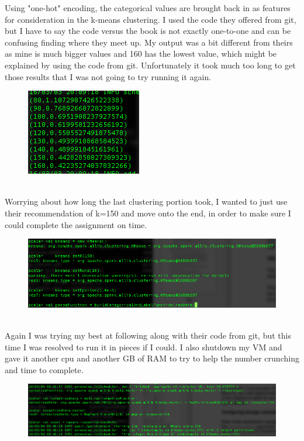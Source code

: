 \documentclass[10pt]{article}
\begin{document}
\indent Using "one-hot" encoding, the categorical values are brought back in as features for consideration in the k-means clustering. I used the code they offered from git, but I have to say the code versus the book is not exactly one-to-one and can be confusing finding where they meet up. My output was a bit different from theirs as mine is much bigger values and 160 has the lowest value, which might be explained by using the code from git. Unfortunately it took much too long to get those results that I was not going to try running it again. 
\begin{figure}[!h]
\includegraphics[scale=0.37]{oneHotCategory.png}
\centering
\end{figure}\\
\indent Worrying about how long the last clustering portion took, I wanted to just use their recommendation of k=150 and move onto the end, in order to make sure I could complete the assignment on time. 
\pagebreak
\begin{figure}[!h]
\includegraphics[scale=0.37]{k150.png}
\centering
\end{figure}\\
\indent Again I was trying my best at following along with their code from git, but this time I was resolved to run it in pieces if I could. I also shutdown my VM and gave it another cpu and another GB of RAM to try to help the number crunching and time to complete.
\begin{figure}[!h]
\includegraphics[scale=0.37]{buildNewModel.png}
\centering
\end{figure}\\
\end{document}

